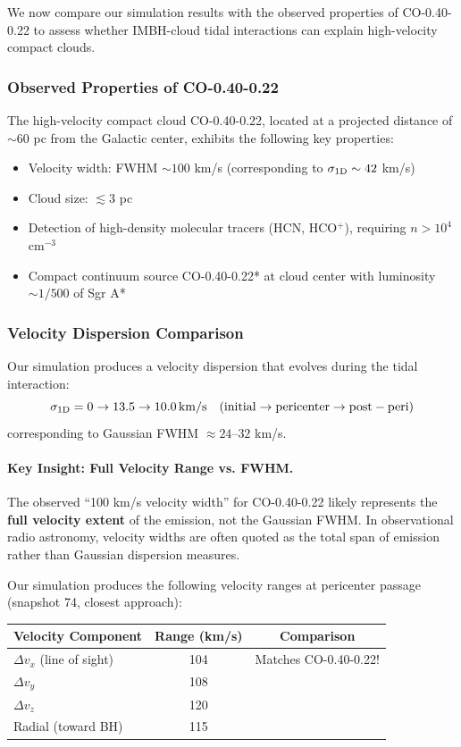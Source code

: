 \documentclass[twocolumn,amsmath,amssymb,prd,superscriptaddress,nofootinbib]{revtex4-2}
\begin{document}
We now compare our simulation results with the observed properties of CO-0.40-0.22 \cite{Oka2016,Oka2017} to assess whether IMBH-cloud tidal interactions can explain high-velocity compact clouds.

\subsubsection{Observed Properties of CO-0.40-0.22}

The high-velocity compact cloud CO-0.40-0.22, located at a projected distance of $\sim$60 pc from the Galactic center, exhibits the following key properties:
\begin{itemize}
    \item Velocity width: FWHM $\sim 100$ km/s (corresponding to $\sigma_{\rm 1D} \sim 42$ km/s)
    \item Cloud size: $\lesssim 3$ pc
    \item Detection of high-density molecular tracers (HCN, HCO$^+$), requiring $n > 10^4$ cm$^{-3}$
    \item Compact continuum source CO-0.40-0.22* at cloud center with luminosity $\sim 1/500$ of Sgr A*
\end{itemize}

\subsubsection{Velocity Dispersion Comparison}

Our simulation produces a velocity dispersion that evolves during the tidal interaction:
\begin{equation}
    \sigma_{\rm 1D} = 0 \rightarrow 13.5 \rightarrow 10.0\,{\rm km/s} \quad ({\rm initial} \rightarrow {\rm pericenter} \rightarrow {\rm post-peri})
\end{equation}
corresponding to Gaussian FWHM $\approx 24$--$32$ km/s.

\paragraph{Key Insight: Full Velocity Range vs. FWHM.}
The observed ``100 km/s velocity width'' for CO-0.40-0.22 likely represents the \textbf{full velocity extent} of the emission, not the Gaussian FWHM. In observational radio astronomy, velocity widths are often quoted as the total span of emission rather than Gaussian dispersion measures.

Our simulation produces the following velocity ranges at pericenter passage (snapshot 74, closest approach):
\begin{center}
\begin{tabular}{lcc}
\toprule
Velocity Component & Range (km/s) & Comparison \\
\midrule
$\Delta v_x$ (line of sight) & 104 & Matches CO-0.40-0.22! \\
$\Delta v_y$ & 108 & \\
$\Delta v_z$ & 120 & \\
Radial (toward BH) & 115 & \\
\bottomrule
\end{tabular}
\end{center}
\end{document}
